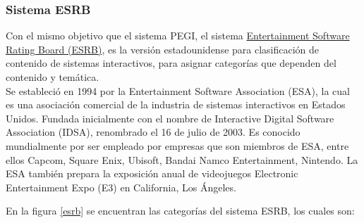 \subsubsection{Sistema ESRB}

Con el mismo objetivo que el sistema PEGI, el sistema \href{https://www.esrb.org/}{Entertainment Software Rating Board (ESRB)}, es la versión estadounidense para clasificación de contenido de sistemas interactivos, para asignar categorías que dependen del contenido y temática. 
\\
Se estableció en 1994 por la Entertainment Software Association (ESA), la cual es una asociación comercial de la industria de sistemas interactivos en Estados Unidos. Fundada inicialmente con el nombre de Interactive Digital Software Association (IDSA), renombrado el 16 de julio de 2003. Es conocido mundialmente por ser empleado por empresas que son miembros de ESA, entre ellos Capcom, Square Enix, Ubisoft, Bandai Namco Entertainment, Nintendo. La ESA también prepara la exposición anual de videojuegos Electronic Entertainment Expo (E3) en California, Los Ángeles.


En la figura \ref{esrb} se encuentran las categorías del sistema ESRB, los cuales son:

